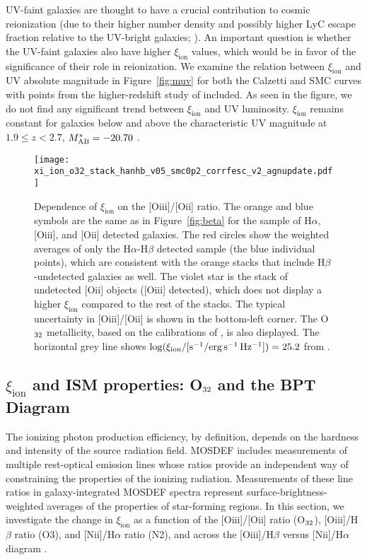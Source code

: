 \documentclass[iop]{emulateapj}
\newcommand{\xiion}{\ensuremath{\xi_{\mathrm{ion}}}}
\newcommand{\halpha}{H\ensuremath{\alpha}}
\newcommand{\hbeta}{H\ensuremath{\beta}}
\def\o32{{O$_{\rm 32}$}}
\begin{document}
UV-faint galaxies are thought to have a crucial contribution to cosmic reionization (due to their higher number density and possibly higher LyC escape fraction relative to the UV-bright galaxies; \citealt{ciardi12,duncan15,dijkstra16,anderson17,grazian17,japeli17}). An important question is whether the UV-faint galaxies also have higher {\xiion} values, which would be in favor of the significance of their role in reionization. 
We examine the relation between {\xiion} and UV absolute magnitude in Figure~\ref{fig:muv} for both the Calzetti and SMC curves with points from the higher-redshift study of \citet{bouwens16b} included. As seen in the figure, we do not find any significant trend between {\xiion} and UV luminosity. {\xiion} remains constant for galaxies below and above the characteristic UV magnitude at $1.9\leq z<2.7$, $M^*_{\rm AB}=-20.70$ \citep{reddy09}.

\begin{figure}[tbp]
	\centering
		\texttt{[image: xi\_ion\_o32\_stack\_hanhb\_v05\_smc0p2\_corrfesc\_v2\_agnupdate.pdf]}
		\caption{Dependence of {\xiion} on the [O{\sc iii}]/[O{\sc ii}] ratio.
		The orange and blue symbols are the same as in Figure~\ref{fig:beta} for the sample of {\halpha}, [O{\sc iii}], and [O{\sc ii}] detected galaxies.
		The red circles show the weighted averages of only the {\halpha}-{\hbeta} detected sample (the blue individual points), which are consistent with the orange stacks that include {\hbeta}-undetected galaxies as well.
		The violet star is the stack of undetected [O{\sc ii}] objects ([O{\sc iii}] detected), which does not display a higher {\xiion} compared to the rest of the stacks.
		The typical uncertainty in [O{\sc iii}]/[O{\sc ii}] is shown in the bottom-left corner.
		The {\o32} metallicity, based on the calibrations of \citealt{jones15}, is also displayed. 
		The horizontal grey line shows $\log(\xi_{\rm{ion}}/[{\rm{s^{-1}/erg\,s^{-1}\,Hz^{-1}}}])=25.2$ from \citet{robertson13}.
		}
		\label{fig:o32}
\end{figure}

\subsection{{\xiion} and ISM properties: {\o32} and the BPT Diagram}
\label{sec:gas}

The ionizing photon production efficiency, by definition, depends on the hardness and intensity of the source radiation field. MOSDEF includes measurements of multiple rest-optical emission lines whose ratios provide an independent way of constraining the properties of the ionizing radiation.
Measurements of these line ratios in galaxy-integrated MOSDEF spectra represent surface-brightness-weighted averages of the properties of star-forming regions.
In this section, we investigate the change in {\xiion} as a function of the [O{\sc iii}]/[O{\sc ii}] ratio ({\o32}), [O{\sc iii}]/{\hbeta} ratio (O3), and [N{\sc ii}]/{\halpha} ratio (N2), and across the [O{\sc iii}]/{\hbeta} versus [N{\sc ii}]/{\halpha} diagram \citep[BPT diagram;][]{bpt81}. 
\end{document}
